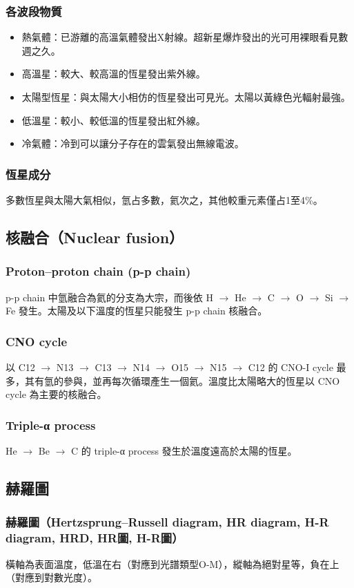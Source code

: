 \documentclass[a4paper,12pt]{report}
\begin{document}
\subsubsection{各波段物質}
\begin{itemize}
\item 熱氣體：已游離的高溫氣體發出X射線。超新星爆炸發出的光可用裸眼看見數週之久。
\item 高溫星：較大、較高溫的恆星發出紫外線。
\item 太陽型恆星：與太陽大小相仿的恆星發出可見光。太陽以黃綠色光輻射最強。
\item 低溫星：較小、較低溫的恆星發出紅外線。
\item 冷氣體：冷到可以讓分子存在的雲氣發出無線電波。
\end{itemize}
\subsubsection{恆星成分}
多數恆星與太陽大氣相似，氫占多數，氦次之，其他較重元素僅占1至4\%。
\subsection{核融合（Nuclear fusion）}
\subsubsection{Proton–proton chain (p-p chain)}
p-p chain 中氫融合為氦的分支為大宗，而後依 H $\rightarrow$ He $\rightarrow$ C $\rightarrow$ O $\rightarrow$  Si $\rightarrow$ Fe 發生。太陽及以下溫度的恆星只能發生 p-p chain 核融合。
\subsubsection{CNO cycle}
以 C12 $\rightarrow$ N13 $\rightarrow$ C13 $\rightarrow$ N14 $\rightarrow$ O15 $\rightarrow$ N15 $\rightarrow$ C12 的 CNO-I cycle 最多，其有氫的參與，並再每次循環產生一個氦。溫度比太陽略大的恆星以 CNO cycle 為主要的核融合。
\subsubsection{Triple-α process}
He $\rightarrow$ Be $\rightarrow$ C 的 triple-α process 發生於溫度遠高於太陽的恆星。
\subsection{赫羅圖}
\subsubsection{赫羅圖（Hertzsprung–Russell diagram, HR diagram, H-R diagram, HRD, HR圖, H-R圖）}
橫軸為表面溫度，低溫在右（對應到光譜類型O-M），縱軸為絕對星等，負在上（對應到對數光度）。
\bct\bfH\ctr{}\ef\ect
\end{document}
